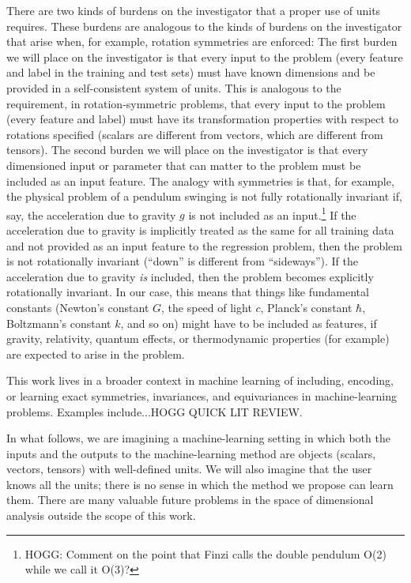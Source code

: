 \documentclass[12pt, letterpaper]{article}
\begin{document}
There are two kinds of burdens on the investigator that a proper use of units requires.
These burdens are analogous to the kinds of burdens on the investigator that arise when, for example, rotation symmetries are enforced:
The first burden we will place on the investigator is that every input to the problem (every feature and label in the training and test sets) must have known dimensions and be provided in a self-consistent system of units.
This is analogous to the requirement, in rotation-symmetric problems, that every input to the problem (every feature and label) must have its transformation properties with respect to rotations specified (scalars are different from vectors, which are different from tensors).
The second burden we will place on the investigator is that every dimensioned input or parameter that can matter to the problem must be included as an input feature.
The analogy with symmetries is that, for example, the physical problem of a pendulum swinging is not fully rotationally invariant if, say, the acceleration due to gravity $g$ is not included as an input.\footnote{HOGG: Comment on the point that Finzi \cite{finzi} calls the double pendulum O(2) while we \cite{yao} call it O(3)?}
If the acceleration due to gravity is implicitly treated as the same for all training data and not provided as an input feature to the regression problem, then the problem is not rotationally invariant (``down'' is different from ``sideways'').
If the acceleration due to gravity \emph{is} included, then the problem becomes explicitly rotationally invariant.
In our case, this means that things like fundamental constants (Newton's constant $G$, the speed of light $c$, Planck's constant $\hbar$, Boltzmann's constant $k$, and so on) might have to be included as features, if gravity, relativity, quantum effects, or thermodynamic properties (for example) are expected to arise in the problem.

This work lives in a broader context in machine learning of including, encoding, or learning exact symmetries, invariances, and equivariances in machine-learning problems.
Examples include...HOGG QUICK LIT REVIEW.

In what follows, we are imagining a machine-learning setting in which both the inputs and the outputs to the machine-learning method are objects (scalars, vectors, tensors) with well-defined units.
We will also imagine that the user knows all the units; there is no sense in which the method we propose can learn them.
There are many valuable future problems in the space of dimensional analysis outside the scope of this work.
\end{document}
